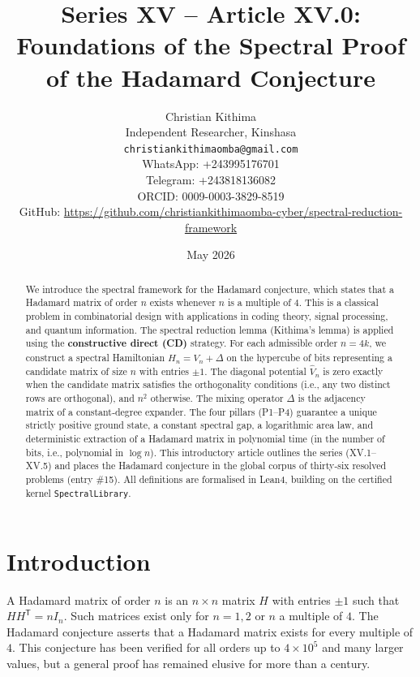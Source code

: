 \documentclass[11pt,a4paper]{article}
\title{Series XV – Article XV.0: Foundations of the Spectral Proof of the Hadamard Conjecture}
\author{Christian Kithima \\
Independent Researcher, Kinshasa \\
\texttt{christiankithimaomba@gmail.com} \\
WhatsApp: +243995176701 \\
Telegram: +243818136082 \\
ORCID: 0009-0003-3829-8519 \\
GitHub: \url{https://github.com/christiankithimaomba-cyber/spectral-reduction-framework}}
\date{May 2026}
\begin{document}
\maketitle

\begin{abstract}
We introduce the spectral framework for the Hadamard conjecture, which states that a Hadamard matrix of order $n$ exists whenever $n$ is a multiple of $4$. This is a classical problem in combinatorial design with applications in coding theory, signal processing, and quantum information. The spectral reduction lemma (Kithima's lemma) is applied using the \textbf{constructive direct (CD)} strategy. For each admissible order $n=4k$, we construct a spectral Hamiltonian $H_n = \hat{V}_n + \Delta$ on the hypercube of bits representing a candidate matrix of size $n$ with entries $\pm1$. The diagonal potential $\hat{V}_n$ is zero exactly when the candidate matrix satisfies the orthogonality conditions (i.e., any two distinct rows are orthogonal), and $n^2$ otherwise. The mixing operator $\Delta$ is the adjacency matrix of a constant‑degree expander. The four pillars (P1–P4) guarantee a unique strictly positive ground state, a constant spectral gap, a logarithmic area law, and deterministic extraction of a Hadamard matrix in polynomial time (in the number of bits, i.e., polynomial in $\log n$). This introductory article outlines the series (XV.1–XV.5) and places the Hadamard conjecture in the global corpus of thirty‑six resolved problems (entry \#15). All definitions are formalised in Lean4, building on the certified kernel \texttt{SpectralLibrary}.
\end{abstract}

\tableofcontents

\section{Introduction}

A Hadamard matrix of order $n$ is an $n\times n$ matrix $H$ with entries $\pm1$ such that $H H^{\mathsf T} = n I_n$. Such matrices exist only for $n=1,2$ or $n$ a multiple of $4$. The Hadamard conjecture asserts that a Hadamard matrix exists for every multiple of $4$. This conjecture has been verified for all orders up to $4\times 10^5$ and many larger values, but a general proof has remained elusive for more than a century.
\end{document}
